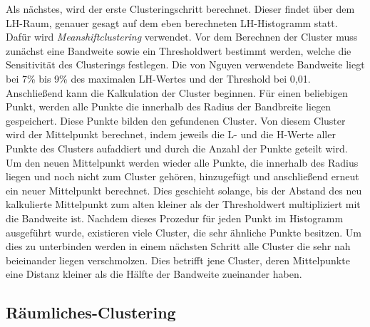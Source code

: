 Als nächstes, wird der erste Clusteringschritt berechnet. Dieser findet über dem LH-Raum, genauer gesagt auf dem eben berechneten LH-Histogramm statt. Dafür wird \textit{Meanshiftclustering} verwendet.
\newline
Vor dem Berechnen der Cluster muss zunächst eine Bandweite sowie ein Thresholdwert bestimmt werden, welche die Sensitivität des Clusterings festlegen.
\newline
Die von Nguyen \cite{nguyen2012clustering} verwendete Bandweite liegt bei 7\% bis 9\% des maximalen LH-Wertes und der Threshold bei 0,01. Anschließend kann die Kalkulation der Cluster beginnen.
\newline
Für einen beliebigen Punkt, werden alle Punkte die innerhalb des Radius der Bandbreite liegen gespeichert. Diese Punkte bilden den gefundenen Cluster. Von diesem Cluster wird der Mittelpunkt berechnet, indem jeweils die L- und die H-Werte aller Punkte des Clusters aufaddiert und durch die Anzahl der Punkte geteilt wird.
\newline
Um den neuen Mittelpunkt werden wieder alle Punkte, die innerhalb des Radius liegen und noch nicht zum Cluster gehören, hinzugefügt und anschließend erneut ein neuer Mittelpunkt berechnet.
\newline
Dies geschieht solange, bis der Abstand des neu kalkulierte Mittelpunkt zum alten kleiner als der Thresholdwert multipliziert mit die Bandweite ist. 
\newline
Nachdem dieses Prozedur für jeden Punkt im Histogramm ausgeführt wurde, existieren viele Cluster, die sehr ähnliche Punkte besitzen.
\newline
Um dies zu unterbinden werden in einem nächsten Schritt alle Cluster die sehr nah beieinander liegen verschmolzen. Dies betrifft jene Cluster, deren Mittelpunkte eine Distanz kleiner als die Hälfte der Bandweite zueinander haben.

\subsection{Räumliches-Clustering}

